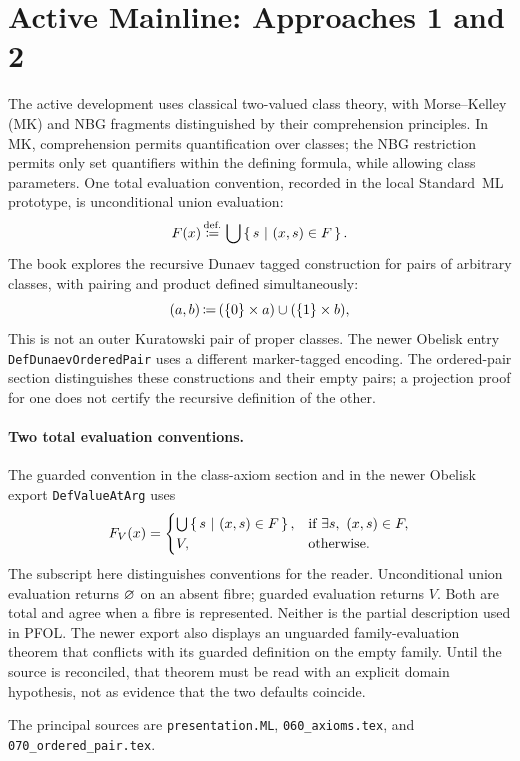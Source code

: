 \section{Active Mainline: Approaches 1 and 2}

The active development uses classical two-valued class theory, with
Morse--Kelley (MK) and NBG fragments distinguished by their comprehension
principles. In MK, comprehension permits quantification over classes; the
NBG restriction permits only set quantifiers within the defining formula,
while allowing class parameters. One total evaluation convention, recorded
in the local Standard~ML prototype, is unconditional union evaluation:
\[
F(x)\,{\stackrel{{\textrm{def.}}}{\coloneqq}}\,\bigcup\left\{\,s\ \middle|\ (x,s)\in F\,\right\}.
\]
The book explores the recursive Dunaev tagged construction for pairs of
arbitrary classes, with pairing and product defined simultaneously:
\[
(a,b)\,{\coloneqq}\,(\{0\}\times a)\cup(\{1\}\times b),
\]
This is not an outer Kuratowski pair of proper classes. The newer Obelisk
entry \texttt{DefDunaev\allowbreak OrderedPair} uses a different marker-tagged encoding.
The ordered-pair section distinguishes these constructions and their empty
pairs; a projection proof for one does not certify the recursive definition
of the other.

\paragraph{Two total evaluation conventions.}
The guarded convention in the class-axiom section and in the newer Obelisk
export \texttt{DefValueAtArg} uses
\[
F_V(x)=
\begin{cases}
\bigcup\left\{\,s\ \middle|\ (x,s)\in F\,\right\},&\text{if }\exists s,\ (x,s)\in F,\\
V,&\text{otherwise}.
\end{cases}
\]
The subscript here distinguishes conventions for the reader. Unconditional
union evaluation returns $\varnothing$ on an absent fibre; guarded evaluation
returns $V$. Both are total and agree when a fibre is represented. Neither
is the partial description used in PFOL. The newer export also displays an
unguarded family-evaluation theorem that conflicts with its guarded
definition on the empty family. Until the source is reconciled, that theorem
must be read with an explicit domain hypothesis, not as evidence that the
two defaults coincide.

The principal sources are
\texttt{presentation.ML}, \texttt{060\_\allowbreak axioms.tex}, and
\texttt{070\_\allowbreak ordered\_\allowbreak pair.tex}.

